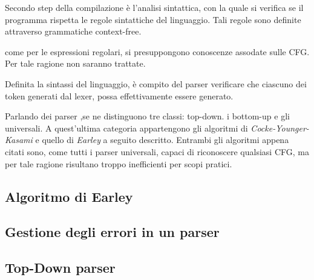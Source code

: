 \documentclass{subfiles}
\begin{document}
Secondo step della compilazione è l'analisi sintattica, con la quale si verifica se il programma rispetta le regole sintattiche del linguaggio.
Tali regole sono definite attraverso grammatiche context-free.

\begin{Note*}
    come per le espressioni regolari, si presuppongono conoscenze assodate sulle CFG.
    Per tale ragione non saranno trattate.
\end{Note*}
Definita la sintassi del linguaggio, è compito del parser verificare che ciascuno dei token generati dal lexer, possa effettivamente essere generato.

Parlando dei parser ,se ne distinguono tre classi: top-down. i bottom-up e gli universali.
A quest'ultima categoria appartengono gli algoritmi di \emph{Cocke-Younger-Kasami} e quello di \emph{Earley} a seguito descritto.
Entrambi gli algoritmi appena citati sono, come tutti i parser universali, capaci di riconoscere qualsiasi CFG,
ma per tale ragione risultano troppo inefficienti per scopi pratici.

\subsection{Algoritmo di Earley}

\clearpage

\subsection{Gestione degli errori in un parser}


\subsection{Top-Down parser}

\end{document}
